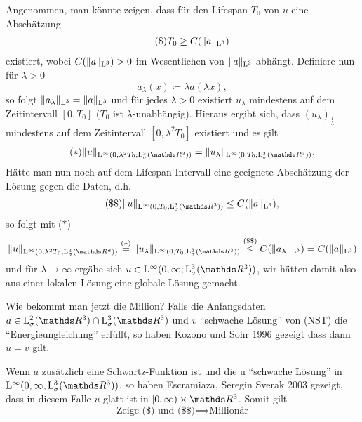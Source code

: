Angenommen, man könnte zeigen, dass für den Lifespan $T_0$ von $u$ eine Abschätzung
\begin{align*}
  \tag{\$} T_0 \geq C(\|a\|_{\mathrm{L}^3})
\end{align*}
existiert, wobei $C(\|a\|_{\mathrm{L}^3}) > 0$ im Wesentlichen von $\|a\|_{\mathrm{L}^3}$ abhängt.
Definiere nun für $\lambda > 0$
$$
a_\lambda(x) \coloneqq \lambda a(\lambda x),
$$
so folgt $\|a_\lambda\|_{\mathrm{L}^3} = \|a\|_{\mathrm{L}^3}$ und für jedes $\lambda > 0$ existiert $u_\lambda$ mindestens auf dem Zeitintervall $[0,T_0]$ ($T_0$ ist $\lambda$-unabhängig).
Hieraus ergibt sich, dass $(u_\lambda)_{\frac{1}{\lambda}}$ mindestens auf dem Zeitintervall $[0,\lambda^2 T_0]$ existiert und es gilt
\begin{align*}
  \tag{$\ast$} \|u\|_{\Ell^\infty(0,\lambda^2 T_0; \Ell^3_\sigma(\R^3))} = \|u_\lambda\|_{\Ell^\infty(0,T_0; \Ell^3_\sigma(\R^3))}.
\end{align*} 
Hätte man nun noch auf dem Lifespan-Intervall eine geeignete Abschätzung der Lösung gegen die Daten, d.h.
\begin{align*}
  \tag{\$\$} \|u\|_{\Ell^\infty(0,T_0; \Ell^3_\sigma(\R^3))} \leq C(\|a\|_{\Ell^3}),
\end{align*}
so folgt mit ($\ast$)
$$
\|u\|_{\Ell^\infty(0,\lambda^2 T_0; \Ell^3_\sigma(\R^d))}
\overset{\text{($\ast$)}}{=} \|u_\lambda\|_{\Ell^\infty(0,T_0; \Ell^3_\sigma(\R^3))}
\overset{\text{(\$\$)}}{\leq} C(\|a_\lambda\|_{\Ell^3}) = C(\|a\|_{\Ell^3})
$$
und für $\lambda \to \infty$ ergäbe sich $u \in \Ell^\infty(0,\infty; \Ell^3_\sigma(\R^3))$, wir hätten damit also aus einer lokalen Lösung eine globale Lösung gemacht.

Wie bekommt man jetzt die Million?
Falls die Anfangsdaten $a \in \Ell^2_\sigma(\R^3) \cap \Ell^3_\sigma(\R^3)$ und $v$ ``schwache Lösung'' von (NST) die ``Energieungleichung'' erfüllt, so haben Kozono und Sohr 1996 gezeigt dass dann $u = v$ gilt.

Wenn $a$ zusätzlich eine Schwartz-Funktion ist und die u ``schwache Lösung'' in $\Ell^\infty(0,\infty,\Ell^3_\sigma(\R^3))$, so haben Escramiaza, Seregin Sverak 2003 gezeigt, dass in diesem Falle $u$ glatt ist in $[0,\infty) \times \R^3$. Somit gilt
$$
\text{Zeige (\$) und (\$\$)} \implies \text{Millionär}
$$

